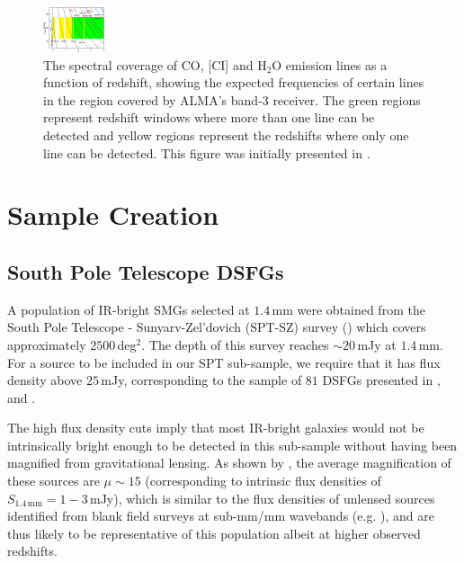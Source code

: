 \begin{figure}
	\centering
	\includegraphics[width=0.8\columnwidth]{Figures/redshift_ladder.pdf}
	\caption[Spectral coverage of molecular emission lines]{The spectral coverage of CO, [CI] and H$_2$O emission lines as a function of redshift, showing the expected frequencies of certain lines in the region covered by ALMA's band-3 receiver. The green regions represent redshift windows where more than one line can be detected and yellow regions represent the redshifts where only one line can be detected. This figure was initially presented in \citealt{Weiss_2013}.}
	\label{fig:redshift_ladder}
\end{figure}

\section{Sample Creation}

\subsection{South Pole Telescope DSFGs}

A population of IR-bright SMGs selected at $1.4\,$mm were obtained from the South Pole Telescope - Sunyarv-Zel'dovich (SPT-SZ) survey (\citealt{Vieira_2010, Mocanu_2013, Everett_2020}) which covers approximately $2500\,$deg$^2$. The depth of this survey reaches $\sim 20\,$mJy at $1.4\,$mm. For a source to be included in our SPT sub-sample, we require that it has flux density above $25\,$mJy, corresponding to the sample of $81$ DSFGs presented in \citealt{Weiss_2013}, \citealt{Strandet_2016} and \citealt{Reuter_2020}.

The high flux density cuts imply that most IR-bright galaxies would not be intrinsically bright enough to be detected in this sub-sample without having been magnified from gravitational lensing. As shown by \citealt{Weiss_2013}, the average magnification of these sources are $\mu \sim 15$ (corresponding to intrinsic flux densities of $S_{1.4\,\textrm{mm}} = 1 - 3\,$mJy), which is similar to the flux densities of unlensed sources identified from blank field surveys at sub-mm/mm wavebands (e.g. \citealt{Coppin_2006, Pope_2006, Weiss_2009}), and are thus likely to be representative of this population albeit at higher observed redshifts.

